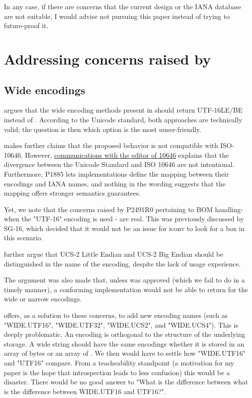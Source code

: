 \documentclass{wg21}
\begin{document}
In any case, if there are concerns that the current design or the IANA database are not suitable, I would advise not pursuing this paper instead of trying to future-proof it.


\label{P2491-concerns} \section{Addressing concerns raised by  }

\subsection{Wide encodings}

 argues that the wide encoding methods present in  should return UTF-16LE/BE instead of .
According to the Unicode standard, both approaches are technically valid; the question is then which option is the most uuser-friendly.

\begin{note}
     makes further claims that the proposed behavior is not compatible with ISO-10646. However, \href{https://lists.isocpp.org/sg16/2021/11/2856.php}{communications with the editor of 10646} explains that the divergence between the Unicode Standard and ISO 10646 are not intentional. Furthermore, P1885 lets implementations define the mapping between their encodings and IANA names, and nothing in the wording suggests that the mapping offers stronger semantics guarantees.
\end{note}

Yet, we note that the concerns raised by P2491R0 pertaining to  BOM handling- when the "UTF-16" encoding is used - are real. This was previously discussed by SG-16, which decided that it would not be an issue for iconv to look for a box in this scenario.


 further argue that UCS-2 Little Endian and UCS-2 Big Endian should be distinguished in the name of the encoding,
despite the lack of usage experience.

The argument was also made that, unless  was approved (which we fail to do in a timely manner), a conforming implementation would not be able to return  for the wide or narrow encodings.


 offers, as a solution to these concerns, to add new encoding names (such as "WIDE.UTF16", "WIDE.UTF32", "WIDE.UCS2", and "WIDE.UCS4").
This is deeply problematic.
An encoding is orthogonal to the structure of the underlying storage. A wide string should have the same encodings whether it is stored in an array of bytes or an array of .
We then would have to settle how "WIDE.UTF16" and "UTF16" compare.
From a teacheability standpoint (a motivation for my paper is the hope that introspection leads to less confusion) this would be a disaster.
There would be no good answer to "What is the difference between what is the difference between WIDE.UTF16 and UTF16?".
\end{document}
